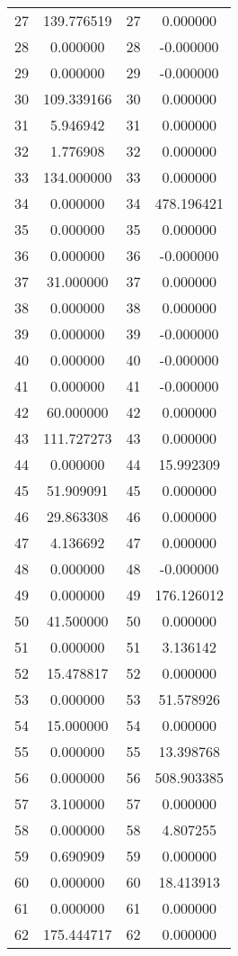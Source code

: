 \documentclass[12pt]{article}
\begin{document}
\begin{longtable}{@{}cccc@{}}
27 & 139.776519 & 27 & 0.000000 \\
28 & 0.000000 & 28 & -0.000000 \\
29 & 0.000000 & 29 & -0.000000 \\
30 & 109.339166 & 30 & 0.000000 \\
31 & 5.946942 & 31 & 0.000000 \\
32 & 1.776908 & 32 & 0.000000 \\
33 & 134.000000 & 33 & 0.000000 \\
34 & 0.000000 & 34 & 478.196421 \\
35 & 0.000000 & 35 & 0.000000 \\
36 & 0.000000 & 36 & -0.000000 \\
37 & 31.000000 & 37 & 0.000000 \\
38 & 0.000000 & 38 & 0.000000 \\
39 & 0.000000 & 39 & -0.000000 \\
40 & 0.000000 & 40 & -0.000000 \\
41 & 0.000000 & 41 & -0.000000 \\
42 & 60.000000 & 42 & 0.000000 \\
43 & 111.727273 & 43 & 0.000000 \\
44 & 0.000000 & 44 & 15.992309 \\
45 & 51.909091 & 45 & 0.000000 \\
46 & 29.863308 & 46 & 0.000000 \\
47 & 4.136692 & 47 & 0.000000 \\
48 & 0.000000 & 48 & -0.000000 \\
49 & 0.000000 & 49 & 176.126012 \\
50 & 41.500000 & 50 & 0.000000 \\
51 & 0.000000 & 51 & 3.136142 \\
52 & 15.478817 & 52 & 0.000000 \\
53 & 0.000000 & 53 & 51.578926 \\
54 & 15.000000 & 54 & 0.000000 \\
55 & 0.000000 & 55 & 13.398768 \\
56 & 0.000000 & 56 & 508.903385 \\
57 & 3.100000 & 57 & 0.000000 \\
58 & 0.000000 & 58 & 4.807255 \\
59 & 0.690909 & 59 & 0.000000 \\
60 & 0.000000 & 60 & 18.413913 \\
61 & 0.000000 & 61 & 0.000000 \\
62 & 175.444717 & 62 & 0.000000 \\

\end{longtable}
\end{document}

